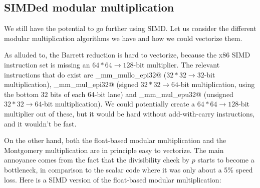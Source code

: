 \subsection{SIMDed modular multiplication}

We still have the potential to go further using SIMD.
Let us consider the different modular multiplication algorithms we have and how we could vectorize them.

As alluded to, the Barrett reduction is hard to vectorize, because the x86 SIMD instruction set is missing an \mbox{$64*64\rightarrow128$}-bit multiplier.
The relevant instructions that do exist are \verb@_mm_mullo_epi32@ (\mbox{$32*32\rightarrow32$}-bit multiplication), \verb@_mm_mul_epi32@ (signed \mbox{$32*32\rightarrow64$}-bit multiplication, using the bottom $32$ bits of each 64-bit lane) and \verb@_mm_mul_epu32@ (unsigned \mbox{$32*32\rightarrow64$}-bit multiplication).
We could potentially create a \mbox{$64*64\rightarrow128$}-bit multiplier out of these, but it would be hard without add-with-carry instructions, and it wouldn't be fast.

On the other hand, both the float-based modular multiplication and the Montgomery multiplication are in principle easy to vectorize.
The main annoyance comes from the fact that the divisibility check by $p$ starts to become a bottleneck, in comparison to the scalar code where it was only about a 5\% speed loss.
Here is a SIMD version of the float-based modular multiplication:


